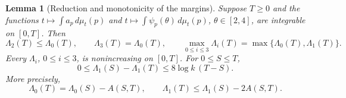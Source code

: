 \documentclass[11pt]{article}
\numberwithin{equation}{section}
\newtheorem{lemma}[theorem]{Lemma}
\theoremstyle{definition}
\theoremstyle{remark}
\newcommand{\1}{\mathbf 1}
\begin{document}
\begin{lemma}[Reduction and monotonicity of the margins]
\label{lem:margin-dominance}
Suppose $T\ge0$ and the functions
$t\mapsto\int a_p\,d\mu_t(p)$ and
$t\mapsto\int\psi_p(\theta)\,d\mu_t(p)$, $\theta\in[2,4]$, are
integrable on $[0,T]$. Then
\begin{equation}\label{eq:dominance-reduction}
 \Lambda_2(T)\le\Lambda_0(T),\qquad
 \Lambda_3(T)=\Lambda_0(T),\qquad
 \max_{0\le i\le3}\Lambda_i(T)=\max\{\Lambda_0(T),\Lambda_1(T)\}.
\end{equation}
Every $\Lambda_i$, $0\le i\le3$, is nonincreasing on $[0,T]$.
For $0\le S\le T$,
\begin{equation}%
\label{eq:lambda-horizon}
 0\le\Lambda_1(S)-\Lambda_1(T)\le8\log k\,(T-S).
\end{equation}
More precisely,
\begin{equation}\label{eq:strict-margin-decrease}
 \Lambda_0(T)=\Lambda_0(S)-A(S,T),\qquad
 \Lambda_1(T)\le\Lambda_1(S)-2A(S,T).
\end{equation}
\end{lemma}
\end{document}
